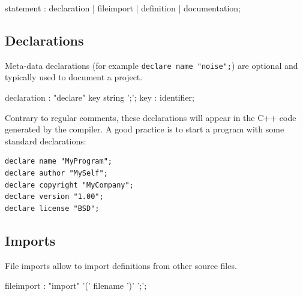 \documentclass[a4paper,10pt]{book}
\begin{document}
\begin{rail}
statement : declaration | fileimport | definition | documentation;
\end{rail}

\subsection{Declarations}

Meta-data declarations (for example \lstinline'declare name "noise";') are optional and typically used to document a \faust project. 

% 

\begin{rail}
declaration : "declare" key string ';';
key : identifier;
\end{rail}

Contrary to regular comments, these declarations will appear in the C++ code generated by the compiler. A good practice is to start a \faust program with some standard declarations:
\begin{lstlisting}
declare name "MyProgram";
declare author "MySelf";
declare copyright "MyCompany";
declare version "1.00";
declare license "BSD"; 
\end{lstlisting}



\subsection{Imports}

File imports allow to import definitions from other source files.  


\begin{rail}
fileimport : "import" '(' filename ')' ';';
\end{rail}
\end{document}
